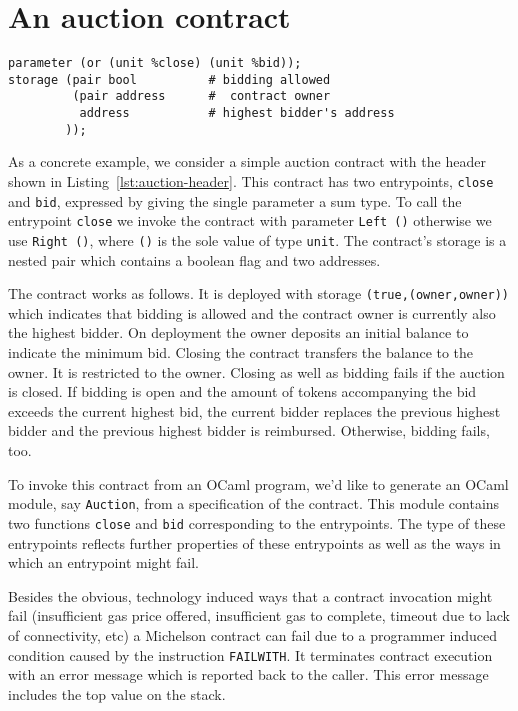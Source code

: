 \documentclass[a4paper,USenglish,american,cleveref, autoref, thm-restate]{oasics-v2021}
\begin{document}
\section{An auction contract}
\label{sec:an-auction-contract}
\begin{lstlisting}[float,caption={Simple auction contract (auction.tz)},captionpos=b,label={lst:auction-header},language=michelson,numbers=none,emph={close,bid},emphstyle=\underbar]
parameter (or (unit %close) (unit %bid));
storage (pair bool          # bidding allowed
         (pair address      #  contract owner
          address           # highest bidder's address
        ));
\end{lstlisting}

As a concrete example, we consider a simple auction contract with the
header shown in Listing~\ref{lst:auction-header}. 
This contract has two entrypoints, \lstinline/close/ and \lstinline/bid/,
expressed by giving the single parameter a sum type. To call the
entrypoint \lstinline/close/ we invoke the contract with parameter \lstinline/Left ()/
otherwise we use \lstinline/Right ()/, where \lstinline/()/ is the sole
value of type \lstinline/unit/. The contract's storage is a nested pair which
contains a boolean flag and two addresses.

The contract works as follows. It is deployed with storage
\lstinline/(true,(owner,owner))/ which indicates that bidding is
allowed and the contract owner is currently also the highest
bidder. On deployment the owner deposits an initial balance to indicate the
minimum bid. Closing the contract transfers the balance to the
owner. It is restricted to the owner. Closing as well as bidding fails
if the auction is
closed. If bidding is open and the amount of tokens accompanying the bid exceeds the
current highest bid, the current bidder replaces the previous highest
bidder and the previous highest bidder is reimbursed. Otherwise,
bidding fails, too.

To invoke this contract from an OCaml program, we'd like to generate an
OCaml module, say \lstinline/Auction/, from a specification of the
contract. This module contains two functions
\lstinline/close/ and \lstinline/bid/ corresponding to the
entrypoints. The type of these entrypoints reflects further properties
of these entrypoints as well as the ways in which an entrypoint might
fail.

Besides the obvious, technology induced ways that a contract invocation might fail
(insufficient gas price offered, insufficient gas to complete, timeout
due to lack of connectivity, etc) a Michelson contract can fail due to
a programmer induced condition caused by the
instruction \lstinline/FAILWITH/. It terminates contract execution
with an error message which is reported back to the caller. This error
message includes the top value on the stack.
\end{document}
